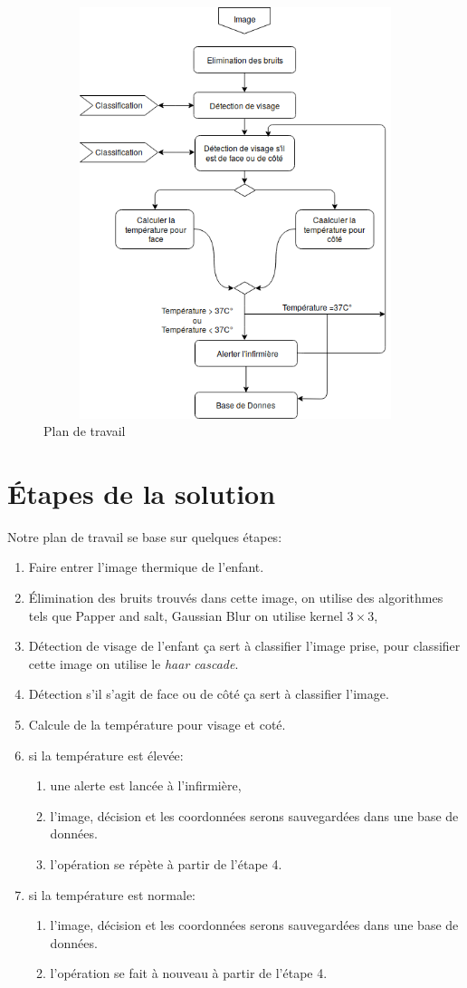 \documentclass[12pt]{article}
\begin{document}
\begin{figure}[h]
	\centering
	\includegraphics[height=12cm,width=12cm]{img-Chapiter-3/Picture1.png}
	\caption{Plan de travail}
\end{figure}

\section{\' Etapes de la solution}
Notre plan de travail se base sur quelques étapes:
\begin{enumerate}
	\item Faire entrer l’image thermique de l’enfant.
	\item \' Elimination des bruits trouvés dans cette image, on utilise des algorithmes tels que Papper and salt, Gaussian Blur on utilise kernel $3 \times 3$, 
	\item Détection de visage de l’enfant ça sert à classifier l’image prise, pour classifier cette image on utilise le \textit{haar cascade}.
	\item Détection s’il s’agit  de face ou de côté ça sert à classifier l’image.
	\item Calcule de la température pour visage et coté. 
	\item si la température est élevée:
	\begin{enumerate}
		\item une alerte est lancée à l’infirmière,
		\item l'image, décision et les coordonnées serons sauvegardées dans une base de données. 
		\item l’opération se répète à partir de  l’étape 4.
	\end{enumerate}
	\item si la température est normale:
	\begin{enumerate}
		\item l'image, décision et les coordonnées serons sauvegardées dans une base de données.
		\item l’opération se fait à nouveau à partir de l'étape 4.
	\end{enumerate}
\end{enumerate}
\end{document}
